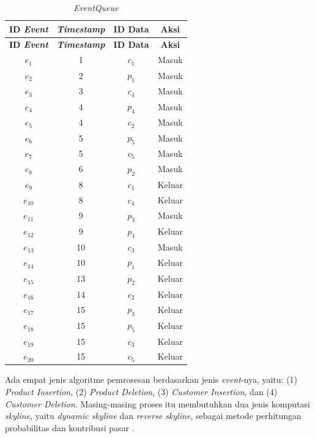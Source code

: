 \begin{small}
	\begin{longtable}{|c|c|c|c|}
		\caption{\textit{EventQueue} \label{tab:event-queue}}\\
		\hline
		\multicolumn{1}{|c|}{\textbf{ID \textit{Event}}} & \multicolumn{1}{c|}{\textbf{\textit{Timestamp}}} & \multicolumn{1}{c}{\textbf{ID Data}} & \multicolumn{1}{|c|}{\textbf{Aksi}} \\ \hline 
		\endfirsthead
		\hline
		\multicolumn{1}{|c|}{\textbf{ID \textit{Event}}} & \multicolumn{1}{c|}{\textbf{\textit{Timestamp}}} & \multicolumn{1}{c}{\textbf{ID Data}} & \multicolumn{1}{|c|}{\textbf{Aksi}} \\ \hline
		\endhead
		$e_1$ & 1 & $c_1$ & Masuk \\ \hline
		$e_2$ & 2 & $p_1$ & Masuk \\ \hline
		$e_3$ & 3 & $c_4$ & Masuk \\ \hline
		$e_4$ & 4 & $p_4$ & Masuk \\ \hline
		$e_5$ & 4 & $c_2$ & Masuk \\ \hline
		$e_6$ & 5 & $p_5$ & Masuk \\ \hline
		$e_7$ & 5 & $c_5$ & Masuk \\ \hline
		$e_8$ & 6 & $p_2$ & Masuk \\ \hline
		$e_9$ & 8 & $c_1$ & Keluar \\ \hline
		$e_{10}$ & 8 & $c_4$ & Keluar \\ \hline
		$e_{11}$ & 9 & $p_3$ & Masuk \\ \hline
		$e_{12}$ & 9 & $p_4$ & Keluar \\ \hline
		$e_{13}$ & 10 & $c_3$ & Masuk \\ \hline
		$e_{14}$ & 10 & $p_1$ & Keluar \\ \hline
		$e_{15}$ & 13 & $p_2$ & Keluar \\ \hline
		$e_{16}$ & 14 & $c_2$ & Keluar \\ \hline
		$e_{17}$ & 15 & $p_3$ & Keluar \\ \hline
		$e_{18}$ & 15 & $p_5$ & Keluar \\ \hline
		$e_{19}$ & 15 & $c_3$ & Keluar \\ \hline
		$e_{20}$ & 15 & $c_5$ & Keluar \\ \hline
	\end{longtable}
\end{small}

\pagebreak
Ada empat jenis algoritme pemrosesan berdasarkan jenis \textit{event}-nya, yaitu: (1) \textit{Product Insertion}, (2) \textit{Product Deletion}, (3) \textit{Customer Insertion}, dan (4) \textit{Customer Deletion}. Masing-masing proses itu membutuhkan dua jenis komputasi \textit{skyline}, yaitu \textit{dynamic skyline} dan \textit{reverse skyline}, sebagai metode perhitungan probabilitas dan kontribusi pasar \cite{kmpp}. 

